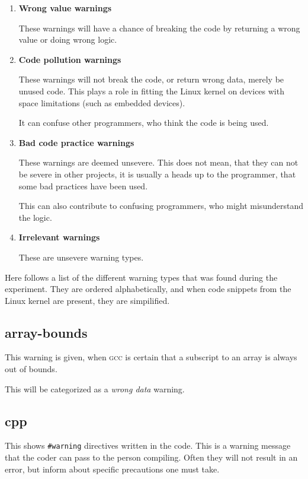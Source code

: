 \documentclass[a4paper,11pt]{report}
\newcommand{\textcode}[1]{\fboxsep=1pt\texttt{\colorbox{gray!20}{#1}}}
\newcommand{\figa}{
    \begin{figure}[!htpb]
    \centering
}
\newcommand{\figb}[2]{
    \caption{#1}
    \label{#2}
    \end{figure}
}
\begin{document}
\begin{enumerate}
    \item \textbf{Wrong value warnings}

These warnings will have a chance of breaking the code by returning a wrong
value or doing wrong logic.

    \item \textbf{Code pollution warnings}

These warnings will not break the code, or return wrong data, merely be 
unused code. This plays a role in fitting the Linux kernel on devices with 
space limitations (such as embedded devices).

It can confuse other programmers, who think the code is being used.

    \item \textbf{Bad code practice warnings}

These warnings are deemed unsevere. This does not mean, that they can not be 
severe in other projects, it is usually a heads up to the programmer, that some 
bad practices have been used.

This can also contribute to confusing programmers, who might misunderstand the 
logic.


    \item \textbf{Irrelevant warnings}

These are unsevere warning types.

\end{enumerate}


Here follows a list of the different warning types that was found during the 
experiment.  They are ordered alphabetically, and when code snippets from the 
Linux kernel are present, they are simpilified.


            \subsection*{array-bounds}
This warning is given, when \textsc{gcc} is certain that a subscript to an array is always 
out of bounds.

This will be categorized as a \emph{wrong data} warning.




            \subsection*{cpp}
This shows \textcode{\#warning} directives written in the code. This is a warning
message that the coder can pass to the person compiling. Often they will not result in 
an error, but inform about specific precautions one must take.
\end{document}
